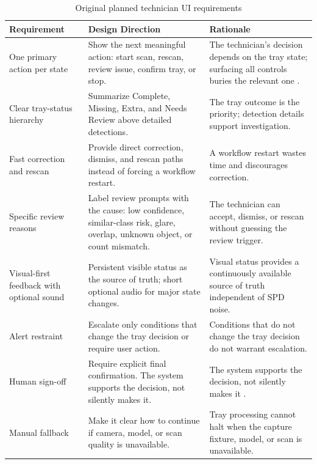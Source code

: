 \documentclass[10pt,a4paper]{article}
\begin{document}
\begin{table}[H]
\centering
\caption{Original planned technician UI requirements}
\label{tab:original-planned-technician-ui-requirements}
\small\renewcommand{\arraystretch}{1.2}\setlength{\tabcolsep}{4pt}
\begin{tabularx}{\textwidth}{|>{\raggedright\arraybackslash}X|>{\raggedright\arraybackslash}X|>{\raggedright\arraybackslash}X|}
\hline
Requirement & Design Direction & Rationale \\
\hline
One primary action per state & Show the next meaningful action: start scan, rescan, review issue, confirm tray, or stop. & The technician's decision depends on the tray state; surfacing all controls buries the relevant one \cite{amershi-et-al-2019}. \\
\hline
Clear tray-status hierarchy & Summarize Complete, Missing, Extra, and Needs Review above detailed detections. & The tray outcome is the priority; detection details support investigation. \\
\hline
Fast correction and rescan & Provide direct correction, dismiss, and rescan paths instead of forcing a workflow restart. & A workflow restart wastes time and discourages correction. \\
\hline
Specific review reasons & Label review prompts with the cause: low confidence, similar-class risk, glare, overlap, unknown object, or count mismatch. & The technician can accept, dismiss, or rescan without guessing the review trigger. \\
\hline
Visual-first feedback with optional sound & Persistent visible status as the source of truth; short optional audio for major state changes. & Visual status provides a continuously available source of truth independent of SPD noise. \\
\hline
Alert restraint & Escalate only conditions that change the tray decision or require user action. & Conditions that do not change the tray decision do not warrant escalation. \\
\hline
Human sign-off & Require explicit final confirmation. The system supports the decision, not silently makes it. & The system supports the decision, not silently makes it \cite{fda-human-factors-accessed-2026}. \\
\hline
Manual fallback & Make it clear how to continue if camera, model, or scan quality is unavailable. & Tray processing cannot halt when the capture fixture, model, or scan is unavailable. \\
\hline
\end{tabularx}
\end{table}
\end{document}
